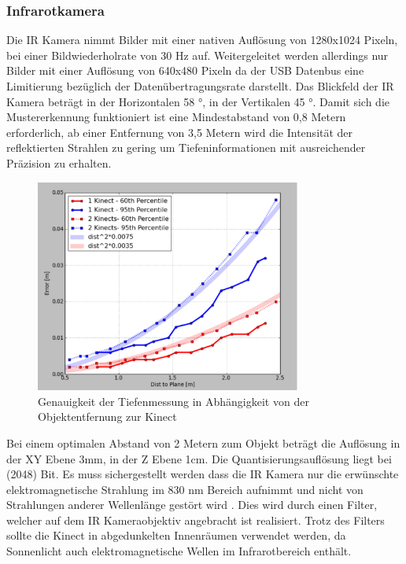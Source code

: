 \subsubsection{Infrarotkamera}
Die IR Kamera nimmt Bilder mit einer nativen Auflösung von 1280x1024 Pixeln, bei einer Bildwiederholrate von 30 Hz auf. Weitergeleitet werden allerdings nur Bilder mit einer Auflösung von 640x480 Pixeln da der USB Datenbus eine Limitierung bezüglich der Datenübertragungsrate darstellt. Das Blickfeld der IR Kamera beträgt in der Horizontalen 58 °, in der Vertikalen 45 °. Damit sich die Mustererkennung funktioniert ist eine Mindestabstand von 0,8 Metern erforderlich, ab einer Entfernung von 3,5 Metern wird die Intensität der reflektierten Strahlen zu gering um Tiefeninformationen mit ausreichender Präzision zu erhalten.
\begin{figure}
  \vspace{-20pt}
  \begin{center}
        \includegraphics[height=7cm]{Res/Res_to_Dist.png}
  \end{center}
  \vspace{-20pt}
  \caption{Genauigkeit der Tiefenmessung in Abhängigkeit von der Objektentfernung zur Kinect }
  \vspace{-10pt}
\end{figure}
Bei einem optimalen Abstand von 2 Metern zum Objekt beträgt die Auflösung in der XY Ebene 3mm, in der Z Ebene 1cm.
Die Quantisierungsauflösung liegt bei  (2048) Bit.
Es muss sichergestellt werden dass die IR Kamera nur die erwünschte elektromagnetische Strahlung im 830 nm Bereich aufnimmt und nicht von Strahlungen anderer Wellenlänge gestört wird . Dies wird durch einen Filter, welcher auf dem IR Kameraobjektiv angebracht ist realisiert.
Trotz des Filters sollte die Kinect in abgedunkelten Innenräumen verwendet werden, da  Sonnenlicht auch elektromagnetische Wellen im Infrarotbereich enthält.
